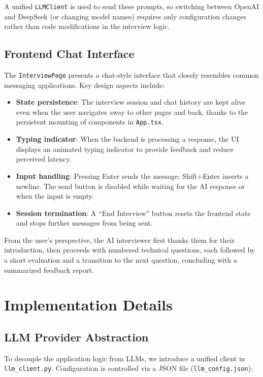 \documentclass[11pt,a4paper]{article}
\begin{document}
A unified \texttt{LLMClient} is used to send these prompts, so switching between OpenAI and DeepSeek (or changing model names) requires only configuration changes rather than code modifications in the interview logic.

\subsection{Frontend Chat Interface}

The \texttt{InterviewPage} presents a chat-style interface that closely resembles common messaging applications. Key design aspects include:

\begin{itemize}
    \item \textbf{State persistence}: The interview session and chat history are kept alive even when the user navigates away to other pages and back, thanks to the persistent mounting of components in \texttt{App.tsx}.
    \item \textbf{Typing indicator}: When the backend is processing a response, the UI displays an animated typing indicator to provide feedback and reduce perceived latency.
    \item \textbf{Input handling}: Pressing Enter sends the message; Shift+Enter inserts a newline. The send button is disabled while waiting for the AI response or when the input is empty.
    \item \textbf{Session termination}: A ``End Interview'' button resets the frontend state and stops further messages from being sent.
\end{itemize}

From the user's perspective, the AI interviewer first thanks them for their introduction, then proceeds with numbered technical questions, each followed by a short evaluation and a transition to the next question, concluding with a summarized feedback report.

\section{Implementation Details}

\subsection{LLM Provider Abstraction}

To decouple the application logic from LLMs, we introduce a unified client in \texttt{llm\_client.py}. Configuration is controlled via a JSON file (\texttt{llm\_config.json}):
\end{document}
